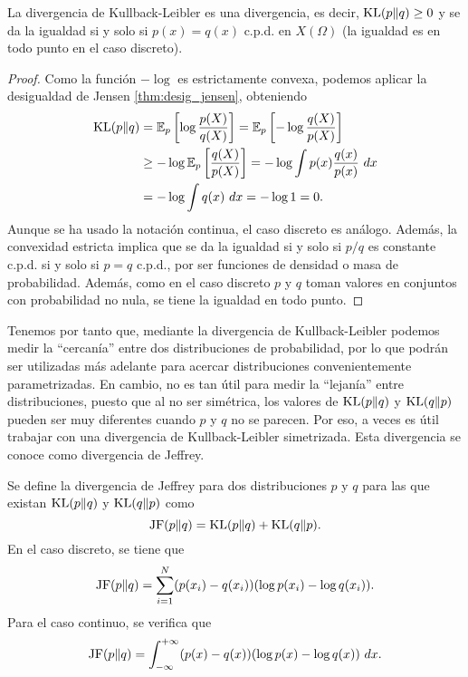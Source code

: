 \begin{thm} \label{thm:desig_infor}
    La divergencia de Kullback-Leibler es una divergencia, es decir, $\operatorname{KL}(p \| q) \ge 0$ y se da la igualdad si y solo si $p(x) = q(x)$ c.p.d. en $X(\Omega)$ (la igualdad es en todo punto en el caso discreto).
\end{thm}

\begin{proof}
    Como la función $-\log$ es estrictamente convexa, podemos aplicar la desigualdad de Jensen \ref{thm:desig_jensen}, obteniendo
    \begin{align*}
        \operatorname{KL}(p \| q) &= \mathbb{E}_p\left[\log\frac{p(X)}{q(X)}\right] 
                    = \mathbb{E}_p\left[-\log\frac{q(X)}{p(X)}\right] \\
                    &\ge -\log\mathbb{E}_p\left[\frac{q(X)}{p(X)}\right] 
                    = -\log\int p(x) \frac{q(x)}{p(x)} \ dx \\
                    &= -\log\int q(x) \ dx = -\log 1 = 0.
    \end{align*}
    Aunque se ha usado la notación continua, el caso discreto es análogo. Además, la convexidad estricta implica que se da la igualdad si y solo si $p/q$ es constante c.p.d. si y solo si $p = q$ c.p.d., por ser funciones de densidad o masa de probabilidad. Además, como en el caso discreto $p$ y $q$ toman valores en conjuntos con probabilidad no nula, se tiene la igualdad en todo punto.
\end{proof}

Tenemos por tanto que, mediante la divergencia de Kullback-Leibler podemos medir la ``cercanía'' entre dos distribuciones de probabilidad, por lo que podrán ser utilizadas más adelante para acercar distribuciones convenientemente parametrizadas. En cambio, no es tan útil para medir la ``lejanía'' entre distribuciones, puesto que al no ser simétrica, los valores de $\operatorname{KL}(p \| q)$ y $\operatorname{KL}(q \| p)$ pueden ser muy diferentes cuando $p$ y $q$ no se parecen. Por eso, a veces es útil trabajar con una divergencia de Kullback-Leibler simetrizada. Esta divergencia se conoce como divergencia de Jeffrey.

\begin{definition}
    Se define la divergencia de Jeffrey para dos distribuciones $p$ y $q$ para las que existan $\operatorname{KL}(p \| q)$ y $\operatorname{KL}(q \| p)$ como
    \[ \operatorname{JF}(p\|q) = \operatorname{KL}(p \| q) + \operatorname{KL}(q \| p). \]
    En el caso discreto, se tiene que
    \[ \operatorname{JF}(p\| q) = \sum_{i =1}^N (p(x_i)-q(x_i))(\log p(x_i) - \log q(x_i)).\]
    Para el caso continuo, se verifica que
    \[ \operatorname{JF}(p\|q) = \int_{-\infty}^{+\infty} (p(x) - q(x))(\log p(x) - \log q(x)) \ dx. \]
\end{definition}


